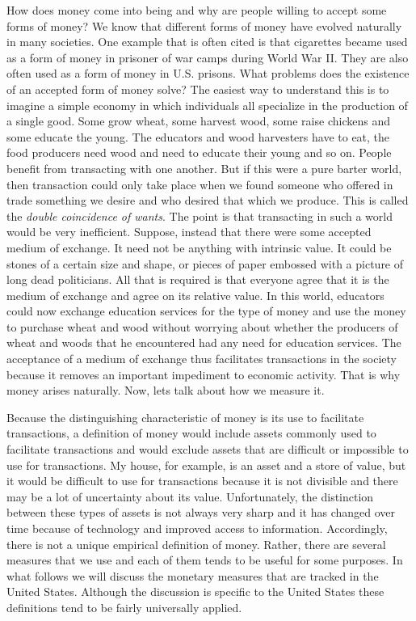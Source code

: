 \documentclass[letterpaper,12pt]{article}
\begin{document}
How does money come into being and why are people willing to accept
some forms of money? We know that different forms of money have
evolved naturally in many societies. One example that is often cited
is that cigarettes became used as a form of money in prisoner of war
camps during World War II. They are also often used as a form of
money in U.S. prisons. What problems does the existence of an
accepted form of money solve? The easiest way to understand this is
to imagine a simple economy in which individuals all specialize in
the production of a single good. Some grow wheat, some harvest wood,
some raise chickens and some educate the young. The educators and
wood harvesters have to eat, the food producers need wood and need
to educate their young and so on. People benefit from transacting
with one another. But if this were a pure barter world, then
transaction could only take place when we found someone who offered
in trade something we desire and who desired that which we produce.
This is called the \textit{double coincidence of wants}. The point
is that transacting in such a world would be very inefficient.
Suppose, instead that there were some accepted medium of exchange.
It need not be anything with intrinsic value. It could be stones of
a certain size and shape, or pieces of paper embossed with a picture
of long dead politicians. All that is required is that everyone
agree that it is the medium of exchange and agree on its relative
value. In this world, educators could now exchange education
services for the type of money and use the money to purchase wheat
and wood without worrying about whether the producers of wheat and
woods that he encountered had any need for education services. The
acceptance of a medium of exchange thus facilitates transactions in
the society because it removes an important impediment to economic
activity. That is why money arises naturally. Now, lets talk about
how we measure it.

Because the distinguishing characteristic of money is its use to
facilitate transactions, a definition of money would include assets
commonly used to facilitate transactions and would exclude assets
that are difficult or impossible to use for transactions. My house,
for example, is an asset and a store of value, but it would be
difficult to use for transactions because it is not divisible and
there may be a lot of uncertainty about its value. Unfortunately,
the distinction between these types of assets is not always very
sharp and it has changed over time because of technology and
improved access to information. Accordingly, there is not a unique
empirical definition of money. Rather, there are several measures
that we use and each of them tends to be useful for some purposes.
In what follows we will discuss the monetary measures that are
tracked in the United States. Although the discussion is specific to
the United States these definitions tend to be fairly universally
applied.
\end{document}
